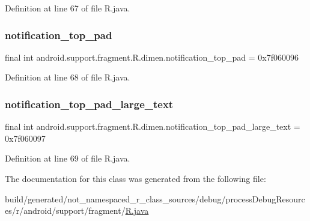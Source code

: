 Definition at line 67 of file R.\+java.

\mbox{\label{classandroid_1_1support_1_1fragment_1_1_r_1_1dimen_acb45a60bdc254e38c8ede4c731c47388}} 
\subsubsection{\texorpdfstring{notification\_top\_pad}{notification\_top\_pad}}
{\footnotesize\ttfamily final int android.\+support.\+fragment.\+R.\+dimen.\+notification\+\_\+top\+\_\+pad = 0x7f060096\hspace{0.3cm}{\ttfamily [static]}}



Definition at line 68 of file R.\+java.

\mbox{\label{classandroid_1_1support_1_1fragment_1_1_r_1_1dimen_a4bbfb4f45a99edc54e4de12edb4b9572}} 
\subsubsection{\texorpdfstring{notification\_top\_pad\_large\_text}{notification\_top\_pad\_large\_text}}
{\footnotesize\ttfamily final int android.\+support.\+fragment.\+R.\+dimen.\+notification\+\_\+top\+\_\+pad\+\_\+large\+\_\+text = 0x7f060097\hspace{0.3cm}{\ttfamily [static]}}



Definition at line 69 of file R.\+java.



The documentation for this class was generated from the following file\+:\begin{DoxyCompactItemize}
\item 
build/generated/not\+\_\+namespaced\+\_\+r\+\_\+class\+\_\+sources/debug/process\+Debug\+Resources/r/android/support/fragment/\mbox{\hyperlink{android_2support_2fragment_2_r_8java}{R.\+java}}\end{DoxyCompactItemize}
